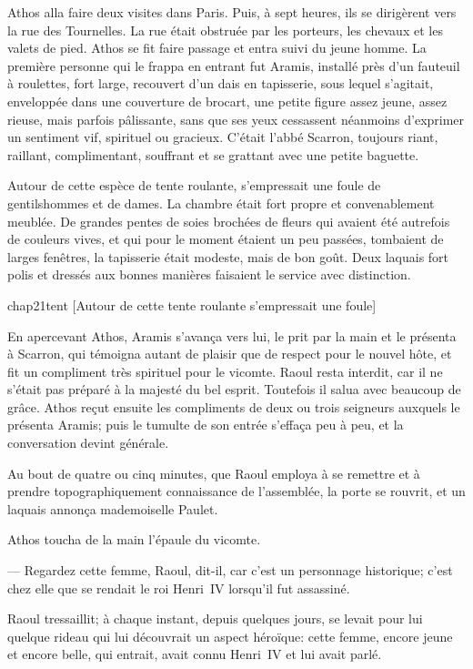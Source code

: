 Athos alla faire deux visites dans Paris. Puis, à sept heures, ils se dirigèrent vers la rue des Tournelles. La rue était obstruée par les porteurs, les chevaux et les valets de pied. Athos se fit faire passage et entra suivi du jeune homme. La première personne qui le frappa en entrant fut Aramis, installé près d'un fauteuil à roulettes, fort large, recouvert d'un dais en tapisserie, sous lequel s'agitait, enveloppée dans une couverture de brocart, une petite figure assez jeune, assez rieuse, mais parfois pâlissante, sans que ses yeux cessassent néanmoins d'exprimer un sentiment vif, spirituel ou gracieux. C'était l'abbé Scarron, toujours riant, raillant, complimentant, souffrant et se grattant avec une petite baguette.

Autour de cette espèce de tente roulante, s'empressait une foule de gentilshommes et de dames. La chambre était fort propre et convenablement meublée. De grandes pentes de soies brochées de fleurs qui avaient été autrefois de couleurs vives, et qui pour le moment étaient un peu passées, tombaient de larges fenêtres, la tapisserie était modeste, mais de bon goût. Deux laquais fort polis et dressés aux bonnes manières faisaient le service avec distinction.

\begin{bwbigpic}
	[\basicscale] 
	{chap21tent}
	[Autour de cette tente roulante s'empressait une foule]
\end{bwbigpic}

En apercevant Athos, Aramis s'avança vers lui, le prit par la main et le présenta à Scarron, qui témoigna autant de plaisir que de respect pour le nouvel hôte, et fit un compliment très spirituel pour le vicomte. Raoul resta interdit, car il ne s'était pas préparé à la majesté du bel esprit. Toutefois il salua avec beaucoup de grâce. Athos reçut ensuite les compliments de deux ou trois seigneurs auxquels le présenta Aramis; puis le tumulte de son entrée s'effaça peu à peu, et la conversation devint générale.

Au bout de quatre ou cinq minutes, que Raoul employa à se remettre et à prendre topographiquement connaissance de l'assemblée, la porte se rouvrit, et un laquais annonça mademoiselle Paulet.

Athos toucha de la main l'épaule du vicomte.

— Regardez cette femme, Raoul, dit-il, car c'est un personnage historique; c'est chez elle que se rendait le roi Henri~IV lorsqu'il fut assassiné.

Raoul tressaillit; à chaque instant, depuis quelques jours, se levait pour lui quelque rideau qui lui découvrait un aspect héroïque: cette femme, encore jeune et encore belle, qui entrait, avait connu Henri~IV et lui avait parlé.

